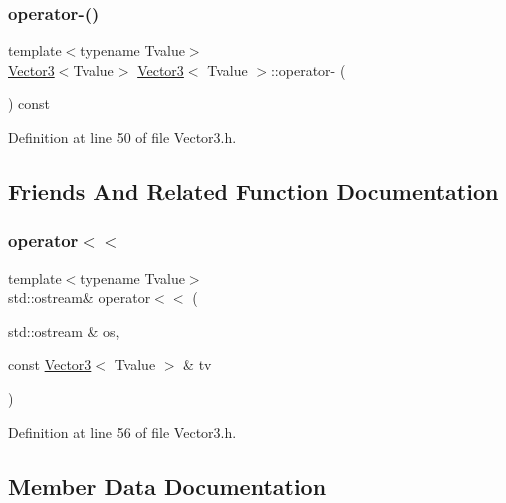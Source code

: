 \subsubsection{\texorpdfstring{operator-\/()}{operator-()}\hspace{0.1cm}{\footnotesize\ttfamily [2/2]}}
{\footnotesize\ttfamily template$<$typename Tvalue$>$ \\
\hyperlink{class_vector3}{Vector3}$<$Tvalue$>$ \hyperlink{class_vector3}{Vector3}$<$ Tvalue $>$\+::operator-\/ (\begin{DoxyParamCaption}{ }\end{DoxyParamCaption}) const\hspace{0.3cm}{\ttfamily [inline]}}



Definition at line 50 of file Vector3.\+h.



\subsection{Friends And Related Function Documentation}
\mbox{\label{class_vector3_a6faebe784277908a475d6a10cb1f45b3}} 
\subsubsection{\texorpdfstring{operator$<$$<$}{operator<<}}
{\footnotesize\ttfamily template$<$typename Tvalue$>$ \\
std\+::ostream\& operator$<$$<$ (\begin{DoxyParamCaption}\item[{std\+::ostream \&}]{os,  }\item[{const \hyperlink{class_vector3}{Vector3}$<$ Tvalue $>$ \&}]{tv }\end{DoxyParamCaption})\hspace{0.3cm}{\ttfamily [friend]}}



Definition at line 56 of file Vector3.\+h.



\subsection{Member Data Documentation}
\mbox{\label{class_vector3_ab6ece7df9cac25e4bf84335c4c5e2a57}} 
